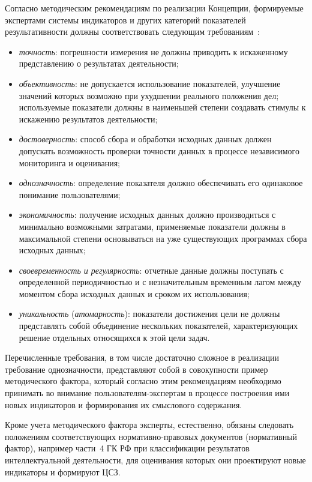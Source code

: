 \begin{multicols}{2}
   Согласно методическим рекомендациям по реализации Концепции, формируемые 
экспертами сис\-те\-мы индикаторов и других категорий показателей результативности должны 
соответствовать сле\-ду\-ющим требованиям~\cite{21zat}:
   \begin{itemize}
\item \textit{точность}: погрешности измерения не должны приводить к искаженному 
представлению о результатах деятельности;
\item \textit{объективность}: не допускается использование показателей, улучшение 
значений которых возможно при ухудшении реального положения дел; используемые 
показатели должны в наименьшей степени создавать стимулы к искажению результатов 
деятельности;
\item \textit{достоверность}: способ сбора и обработки исходных данных должен 
допускать возможность проверки точности данных в процессе независимого мониторинга 
и оценивания;
\item \textit{однозначность}: определение показателя должно обеспечивать его одинаковое 
понимание пользователями;
\item \textit{экономичность}: получение исходных данных должно производиться с 
минимально возможными затратами, применяемые показатели должны в максимальной 
степени основываться на уже существующих программах сбора исходных данных;
\item \textit{своевременность и регулярность}: отчетные данные должны поступать с 
определенной периодичностью и с незначительным временным лагом между моментом 
сбора исходных данных и сроком их использования;
\item \textit{уникальность} (\textit{атомарность}): показатели достижения цели не должны 
представлять собой объединение нескольких показателей, характеризующих решение 
отдельных относящихся к этой цели задач.
\end{itemize}

   Перечисленные требования, в том числе достаточно сложное в реализации требование 
однозначности, представляют собой в совокупности пример методического фактора, 
который согласно этим рекомендациям необходимо принимать во внимание пользователям-экспертам 
в процессе построения ими новых индикаторов и формирования их смыс\-ло\-во\-го 
содержания.
   
   Кроме учета методического фактора эксперты, естественно, обязаны следовать 
положениям соответствующих нормативно-правовых документов (нормативный фактор), 
например части~4 ГК РФ при классификации результатов интеллектуальной деятельности, 
для оценивания которых они проектируют новые индикаторы и формируют ЦСЗ.


\end{multicols}
